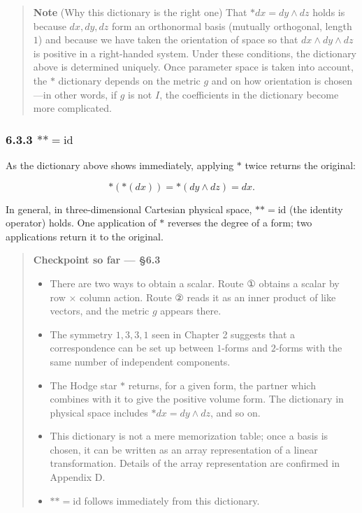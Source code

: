 \documentclass[a4paper,12pt,openany]{book}
\begin{document}
\begin{quote}
\textbf{Note} (Why this dictionary is the right one) That
\(\ast dx = dy \wedge dz\) holds is because \(dx, dy, dz\) form an
orthonormal basis (mutually orthogonal, length \(1\)) and because we
have taken the orientation of space so that \(dx \wedge dy \wedge dz\)
is positive in a right-handed system. Under these conditions, the
dictionary above is determined uniquely. Once parameter space is taken
into account, the \(\ast\) dictionary depends on the metric \(g\) and on
how orientation is chosen—in other words, if \(g\) is not \(I\), the
coefficients in the dictionary become more complicated.
\end{quote}

\hypertarget{astast-mathrmid}{%
\subsubsection{\texorpdfstring{6.3.3
\(\ast\ast = \mathrm{id}\)}{6.3.3 \textbackslash ast\textbackslash ast = \textbackslash mathrm\{id\}}}\label{astast-mathrmid}}

As the dictionary above shows immediately, applying \(\ast\) twice
returns the original:

\[\ast(\ast(dx)) = \ast(dy \wedge dz) = dx.\]

In general, in three-dimensional Cartesian physical space,
\(\ast\ast = \mathrm{id}\) (the identity operator) holds. One
application of \(\ast\) reverses the degree of a form; two applications
return it to the original.

\begin{quote}
\textbf{Checkpoint so far — §6.3}

\begin{itemize}
\item
  There are two ways to obtain a scalar. Route ① obtains a scalar by row
  \(\times\) column action. Route ② reads it as an inner product of like
  vectors, and the metric \(g\) appears there.
\item
  The symmetry \(1, 3, 3, 1\) seen in Chapter 2 suggests that a
  correspondence can be set up between \(1\)-forms and \(2\)-forms with
  the same number of independent components.
\item
  The Hodge star \(\ast\) returns, for a given form, the partner which
  combines with it to give the positive volume form. The dictionary in
  physical space includes \(\ast dx = dy \wedge dz\), and so on.
\item
  This dictionary is not a mere memorization table; once a basis is
  chosen, it can be written as an array representation of a linear
  transformation. Details of the array representation are confirmed in
  Appendix D.
\item
  \(\ast\ast = \mathrm{id}\) follows immediately from this dictionary.
\end{itemize}
\end{quote}
\end{document}
